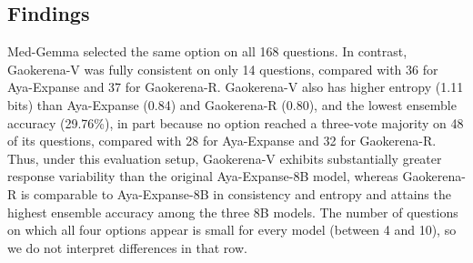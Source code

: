\documentclass[conference]{IEEEtran}
\begin{document}
\begin{table}[ht]
\centering
\small
\caption{Five-run consistency on the September 2023 IBMSEE. Accuracy is the ensemble-answer accuracy (\%) with not-agreed questions counted as incorrect; entropy is the mean per-question Shannon entropy in bits over valid runs (see text).}
\label{tab:instability}
\end{table}

\subsection{Findings}

Med-Gemma selected the same option on all 168 questions. In contrast, Gaokerena-V was fully consistent on only 14 questions, compared with 36 for Aya-Expanse and 37 for Gaokerena-R. Gaokerena-V also has higher entropy (1.11 bits) than Aya-Expanse (0.84) and Gaokerena-R (0.80), and the lowest ensemble accuracy (29.76\%), in part because no option reached a three-vote majority on 48 of its questions, compared with 28 for Aya-Expanse and 32 for Gaokerena-R. Thus, under this evaluation setup, Gaokerena-V exhibits substantially greater response variability than the original Aya-Expanse-8B model, whereas Gaokerena-R is comparable to Aya-Expanse-8B in consistency and entropy and attains the highest ensemble accuracy among the three 8B models. The number of questions on which all four options appear is small for every model (between 4 and 10), so we do not interpret differences in that row.
\end{document}

